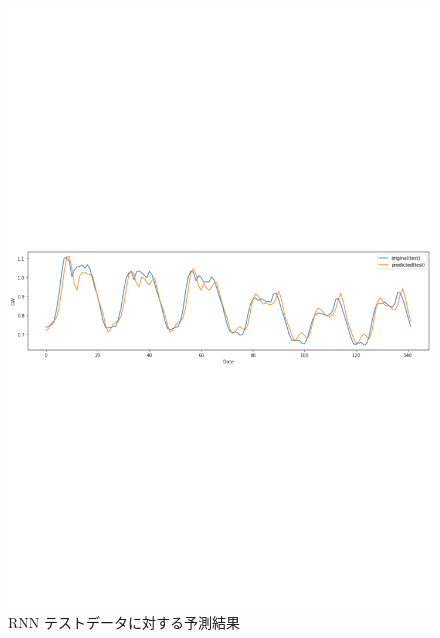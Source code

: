 \begin{figure}[ht]
\begin{center}
\includegraphics[scale=0.55]{rnn_pred_day.pdf}
\vspace{-75mm}
\caption{RNN テストデータに対する予測結果}
\end{center}
\end{figure}

